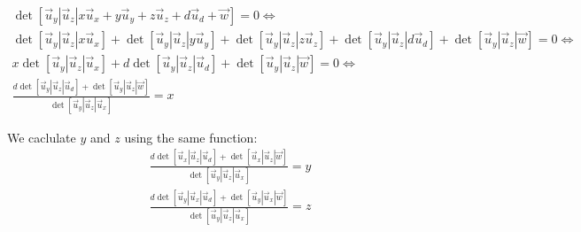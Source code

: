 \documentclass[a4paper]{article}
\begin{document}
\begin{align}
\det[\vec{u}_y | \vec{u}_z | x \vec{u}_x + y \vec{u}_y + z \vec{u}_z + d \vec{u}_d + \vec{w}] = 0 \Leftrightarrow \nonumber\\
\det[\vec{u}_y | \vec{u}_z | x \vec{u}_x] + \det[\vec{u}_y | \vec{u}_z | y \vec{u}_y] + \det[\vec{u}_y | \vec{u}_z | z \vec{u}_z] + \det[\vec{u}_y | \vec{u}_z | d \vec{u}_d] + \det[\vec{u}_y | \vec{u}_z | \vec{w}] = 0 \Leftrightarrow \nonumber \\
x\det[\vec{u}_y | \vec{u}_z | \vec{u}_x] + d\det[\vec{u}_y | \vec{u}_z | \vec{u}_d] + \det[\vec{u}_y | \vec{u}_z | \vec{w}] = 0 \Leftrightarrow \nonumber \\
\frac{d\det[\vec{u}_y | \vec{u}_z | \vec{u}_d] + \det[\vec{u}_y | \vec{u}_z | \vec{w}]}{\det[\vec{u}_y | \vec{u}_z | \vec{u}_x]} = x \nonumber 
\end{align}

We caclulate $y$ and $z$ using the same function:
\begin{align}
\frac{d\det[\vec{u}_x | \vec{u}_z | \vec{u}_d] + \det[\vec{u}_x | \vec{u}_z | \vec{w}]}{\det[\vec{u}_y | \vec{u}_z | \vec{u}_x]} = y \nonumber \\
\frac{d\det[\vec{u}_y | \vec{u}_x | \vec{u}_d] + \det[\vec{u}_y | \vec{u}_x | \vec{w}]}{\det[\vec{u}_y | \vec{u}_z | \vec{u}_x]} = z \nonumber 
\end{align}
\end{document}
